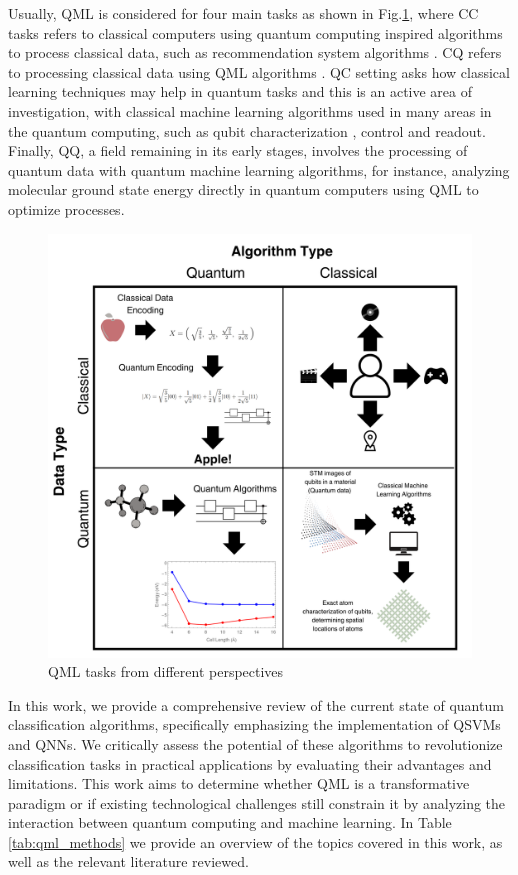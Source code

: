 \documentclass{article}
\begin{document}
Usually, QML is considered for four main tasks as shown in Fig.\ref{fig:qtasks}, where CC tasks refers to classical computers using quantum computing inspired 
algorithms to process classical data, such as recommendation system algorithms \cite{ccalg}. CQ refers to processing classical data using QML algorithms \cite{cq}. 
QC setting asks how classical learning techniques may help in quantum tasks and this is an active area of investigation, with classical machine learning 
algorithms used in many areas in the quantum computing, such as qubit characterization \cite{charqc}, control \cite{controlqc} and readout\cite{readoutqc}. 
Finally, QQ, a field remaining in its early stages, involves the processing of quantum data with quantum machine learning algorithms, 
for instance, analyzing molecular ground state energy directly in quantum computers using QML to optimize processes.

\begin{figure}[h!]
    \centering
    \includegraphics[scale=0.19]{figures/QMLtypes.png}
    \caption{QML tasks from different perspectives}
    \label{fig:qtasks}
\end{figure}

In this work, we provide a comprehensive review of the current state of quantum classification algorithms, specifically emphasizing the implementation of QSVMs 
and QNNs. 
We critically assess the potential of these algorithms to revolutionize classification tasks in practical applications by evaluating their advantages and limitations. 
This work aims to determine whether QML is a transformative paradigm or if existing technological challenges still constrain it by analyzing the interaction between 
quantum computing and machine learning. In Table \ref{tab:qml_methods} we provide an overview of the topics covered in this work, as well as the relevant literature reviewed. 
\end{document}
